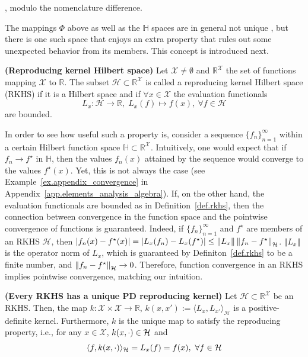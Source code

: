 \begin{my_proof}
	\cite[Theorem~4.16]{steinwart2008svm_book}, modulo the nomenclature difference.
\end{my_proof}

The mappings $\Phi$ above as well as the $\mathbb{H}$ spaces are in general not unique \citep[§4]{steinwart2008svm_book}, but there is one such space that enjoys an extra property that rules out some unexpected behavior from its members. This concept is introduced next.

\begin{definition}
	\label{def.rkhs}
	\textbf{(Reproducing kernel Hilbert space)} 
	Let $\mathcal{X} \neq \emptyset$ and $\mathbb{R}^\mathcal{X}$ the set of functions mapping $\mathcal{X}$ to $\mathbb{R}$. The subset $\mathcal{H} \subset \mathbb{R}^\mathcal{X}$ is called a reproducing kernel Hilbert space (RKHS) if it is a Hilbert space and if $\forall x \in \mathcal{X}$ the evaluation functionals
	\begin{equation}
		L_x: \mathcal{H} \rightarrow \mathbb{R}, \; L_x(f) \mapsto f(x), \ \forall f\in \mathcal{H}
	\end{equation}
	are bounded.
\end{definition}

In order to see how useful such a property is, consider a sequence $\{f_n\}_{n=1}^\infty$ within a certain Hilbert function space $\mathbb{H} \subset \mathbb{R}^\mathcal{X}$. Intuitively, one would expect that if $f_n \rightarrow f^\star$ in $\mathbb{H}$, then the values $f_n(x)$ attained by the sequence would converge to the values $f^\star(x)$. Yet, this is not always the case (see Example~\ref{ex.appendix_convergence} in Appendix~\ref{app.elements_analysis_algebra}). If, on the other hand, the evaluation functionals are bounded as in Definition~\ref{def.rkhs}, then the connection between convergence in the function space and the pointwise convergence of functions is guaranteed. Indeed, if $\{f_n\}_{n=1}^\infty$ and $f^\star$ are members of an RKHS $\mathcal{H}$, then $|f_n(x)-f^\star(x)| = | L_x(f_n) - L_x(f^\star)|  \leq \Vert L_x \Vert \left\| f_n - f^\star \right\|_\mathcal{H}$. $\Vert L_x \Vert $ is the operator norm of $L_x$, which is guaranteed by Definiton~\ref{def.rkhs} to be a finite number, and $\left\| f_n - f^\star \right\|_\mathcal{H} \rightarrow 0$. Therefore, function convergence in an RKHS implies pointwise convergence, matching our intuition.

\begin{proposition}
	\label{prop.unique_reprod_kernel}
	\textbf{(Every RKHS has a unique PD reproducing kernel)} 
	Let $\mathcal{H} \subset \mathbb{R}^\mathcal{X}$ be an RKHS. Then, the map $k: \mathcal{X} \times \mathcal{X} \rightarrow \mathbb{R}$, $k(x,x') := \langle L_x, L_{x'} \rangle_\mathcal{H}$ is a positive-definite kernel. Furthermore, $k$ is the unique map to satisfy the reproducing property, i.e., for any $x \in \mathcal{X}$, $k(x,\cdot) \in \mathcal{H}$ and
	\begin{equation}
		\rkinner{f}{k(x,\cdot)} = L_x(f) = f(x), \ \forall f \in \rkhs
	\end{equation} 
\end{proposition}

